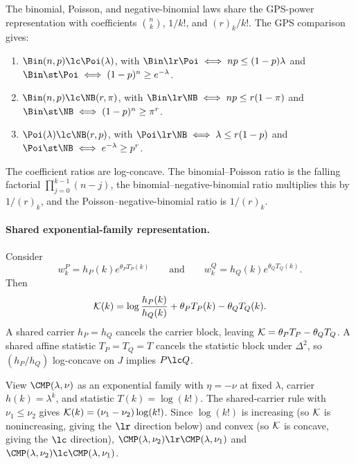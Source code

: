 \documentclass[11pt]{article}
\begin{document}
\begin{example}
\label{ex:katz-between}
The binomial, Poisson, and negative-binomial laws share the GPS-power representation with coefficients \(\binom{n}{k}\), \(1/k!\), and \((r)_k/k!\). The GPS comparison gives:
\begin{enumerate}[label=\textup{(\roman*)}]
\item \(\Bin(n,p)\lc\Poi(\lambda)\), with \(\Bin\lr\Poi\iff np\le(1-p)\lambda\) and \(\Bin\st\Poi\iff(1-p)^n\ge e^{-\lambda}\).
\item \(\Bin(n,p)\lc\NB(r,\pi)\), with \(\Bin\lr\NB\iff np\le r(1-\pi)\) and \(\Bin\st\NB\iff(1-p)^n\ge\pi^r\).
\item \(\Poi(\lambda)\lc\NB(r,p)\), with \(\Poi\lr\NB\iff\lambda\le r(1-p)\) and \(\Poi\st\NB\iff e^{-\lambda}\ge p^r\).
\end{enumerate}
The coefficient ratios are log-concave. The binomial--Poisson ratio is the falling factorial \(\prod_{j=0}^{k-1}(n-j)\), the binomial--negative-binomial ratio multiplies this by \(1/(r)_k\), and the Poisson--negative-binomial ratio is \(1/(r)_k\).
\end{example}

\paragraph{Shared exponential-family representation.}
Consider
\[
w^P_k=h_P(k)e^{\theta_P T_P(k)}
\qquad\text{and}\qquad
w^Q_k=h_Q(k)e^{\theta_Q T_Q(k)}.
\]
Then
\[
{\cal K}(k) =\log\frac{h_P(k)}{h_Q(k)} +\theta_PT_P(k)-\theta_QT_Q(k).
\]
A shared carrier \(h_P=h_Q\) cancels the carrier block, leaving \({\cal K}=\theta_PT_P-\theta_QT_Q\). A shared affine statistic \(T_P=T_Q=T\) cancels the statistic block under \(\Delta^2\), so \((h_P/h_Q)\) log-concave on \(J\) implies \(P\lc Q\).

\begin{example}
\label{ex:cmp-in-nu}
View \(\CMP(\lambda,\nu)\) as an exponential family with \(\eta=-\nu\) at fixed \(\lambda\), carrier \(h(k)=\lambda^k\), and statistic \(T(k)=\log(k!)\). The shared-carrier rule with \(\nu_1\le\nu_2\) gives \({\cal K}(k)=(\nu_1-\nu_2)\log(k!)\). Since \(\log(k!)\) is increasing (so \({\cal K}\) is nonincreasing, giving the \(\lr\) direction below) and convex (so \({\cal K}\) is concave, giving the \(\lc\) direction), \(\CMP(\lambda,\nu_2)\lr\CMP(\lambda,\nu_1)\) and \(\CMP(\lambda,\nu_2)\lc\CMP(\lambda,\nu_1)\).
\end{example}
\end{document}
